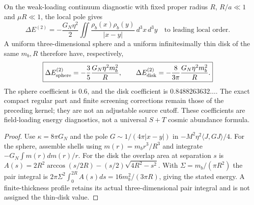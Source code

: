 \documentclass[12pt,a4paper]{article}
\begin{document}
\begin{corollary}
\label{p8:cor:v2206-sphere-disk-energy}
On the weak-loading continuum diagnostic with fixed proper radius $R$,
$R/a\ll1$ and $\mu R\ll1$, the local pole gives
\[
 \Delta E^{(2)}=-\frac{G_N\eta^2}{2}
    \iint\frac{\rho_b(x)\rho_b(y)}{|x-y|}\,d^3x\,d^3y
 \quad\text{to leading local order}.
\]
A uniform three-dimensional sphere and a uniform infinitesimally thin
disk of the same $m_b,R$ therefore have, respectively,
\begin{equation}
\label{p8:eq:v2206-sphere-disk-energy}
 \boxed{\Delta E_{\rm sphere}^{(2)}=-\frac35\frac{G_N\eta^2m_b^2}{R},
 \qquad
 \Delta E_{\rm disk}^{(2)}=-\frac8{3\pi}\frac{G_N\eta^2m_b^2}{R}.}
\end{equation}
The sphere coefficient is $0.6$, and the disk coefficient is
$0.8488263632\ldots$. The exact compact regular part and finite screening
corrections remain those of the preceding kernel; they are not an
adjustable source cutoff. These coefficients are field-loading energy
diagnostics, not a universal $S+T$ cosmic abundance formula.
\end{corollary}
\begin{proof}
Use $\kappa=8\pi G_N$ and the pole $G\sim1/(4\pi|x-y|)$ in
$-M^2\eta^2\langle J,GJ\rangle/4$.
For the sphere, assemble shells using $m(r)=m_br^3/R^3$ and integrate
$-G_N\int m(r)dm(r)/r$. For the disk the overlap area at separation
$s$ is $A(s)=2R^2\arccos(s/2R)-(s/2)\sqrt{4R^2-s^2}$.
With $\Sigma=m_b/(\pi R^2)$ the pair integral is
$2\pi\Sigma^2\int_0^{2R}A(s)ds=16m_b^2/(3\pi R)$,
giving the stated energy. A finite-thickness profile retains its actual
three-dimensional pair integral and is not assigned the thin-disk value.
\end{proof}

\end{document}
